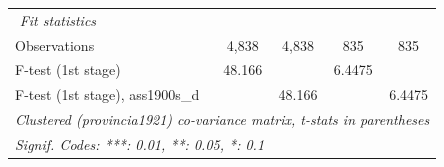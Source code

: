 \begin{tabular}{lcccc}
$$   \emph{Fit statistics}\\
   Observations                     & 4,838                          & 4,838                  & 835             & 835\\  
   F-test (1st stage)               & 48.166                         &                        & 6.4475          & \\  
   F-test (1st stage), ass1900s\_d  &                                & 48.166                 &                 & 6.4475\\  
   \midrule \midrule
   \multicolumn{5}{l}{\emph{Clustered (provincia1921) co-variance matrix, t-stats in parentheses}}\\
   \multicolumn{5}{l}{\emph{Signif. Codes: ***: 0.01, **: 0.05, *: 0.1}}\\
\end{tabular}
\par\endgroup


